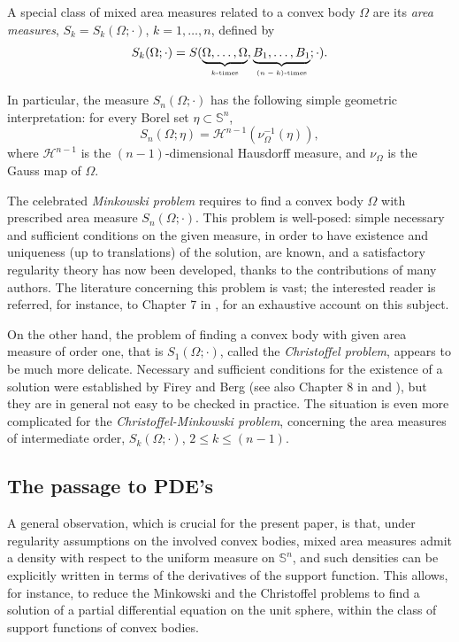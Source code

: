 \documentclass[12pt]{amsart}
\newcommand{\1}{\mathbf 1}
\newcommand{\sfe}{{{\mathbb S}^{n}}}
\begin{document}
A special class of mixed area measures related to a convex body $\Omega$ are its {\em area measures}, $S_k=S_k(\Omega;\cdot)$, $k=1,\dots,n$, defined by
$$
S_k(\Omega;\cdot)=S(\underbrace{\Omega,\dots,\Omega}_{\mbox{\tiny $k$-times}},\underbrace{B_1,\dots,B_1}_{\mbox{\tiny $(n-k)$-times}};\cdot).
$$

In particular, the measure $S_n(\Omega;\cdot)$ has the following simple geometric interpretation: for every Borel set $\eta\subset\sfe$,
$$
S_n(\Omega;\eta)={\mathcal H}^{n-1}(\nu_\Omega^{-1}(\eta)),
$$
where $\mathcal{H}^{n-1}$ is the $(n-1)$-dimensional Hausdorff measure, and $\nu_\Omega$ is the Gauss map of $\Omega$. 

The celebrated {\em Minkowski problem} requires to find a convex body $\Omega$ with prescribed area measure $S_n(\Omega;\cdot)$. This problem is well-posed: simple necessary and sufficient conditions on the given measure, in order to have existence and uniqueness (up to translations) of the solution, are known, and a satisfactory regularity theory has now been developed, thanks to the contributions of many authors. The literature concerning this problem is vast; the interested reader is referred, for instance, to Chapter 7 in \cite{Schneider}, for an exhaustive account on this subject.

On the other hand, the problem of finding a convex body with given area measure of order one, that is $S_1(\Omega;\cdot)$, called the {\em Christoffel problem}, appears to be much more delicate.  Necessary and sufficient conditions for the existence of a solution were established by Firey \cite{Firey} and Berg \cite{Berg} (see also Chapter 8 in \cite{Schneider} and \cite{LWW}), but they are in general not easy to be checked in practice. The situation is even more complicated for the {\em Christoffel-Minkowski problem}, concerning the area measures of intermediate order, $S_k(\Omega;\cdot)$, $2\le k\le (n-1)$. 

\medskip

\subsection{The passage to PDE's} A general observation, which is crucial for the present paper, is that, under regularity assumptions on the involved convex bodies, mixed area measures admit a density with respect to the uniform measure on $\sfe$, and such densities can be explicitly written in terms of the derivatives of the support function. This allows, for instance, to reduce the Minkowski and the Christoffel problems to find a solution of a partial differential equation on the unit sphere, within the class of support functions of convex bodies.
\end{document}
